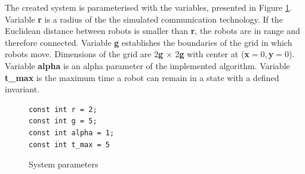 \noindent
The created system is parameterised with the variables, presented in Figure \ref{fig:parameters}. Variable \textbf{r} is a radius of the the simulated communication technology. If the Euclidean distance between robots is smaller than \textbf{r}, the robots are in range and therefore connected. Variable \textbf{g} establishes the boundaries of the grid in which robots move. Dimensions of the grid are 2\textbf{g} $\times$ 2\textbf{g} with center at (\textbf{x}$=0, $\textbf{y}$=0$). Variable \textbf{alpha} is an alpha parameter of the implemented algorithm. Variable \textbf{t\_max} is the maximum time a robot can remain in a state with a defined invariant.

\begin{figure}[H]
\caption{System parameters}
\lstset { language=C++ }
\begin{lstlisting}
const int r = 2;
const int g = 5;
const int alpha = 1;
const int t_max = 5
\end{lstlisting}
\label{fig:parameters}
\end{figure}


